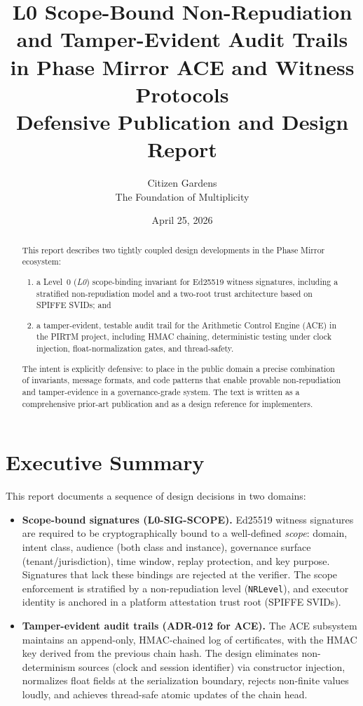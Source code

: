 \documentclass[11pt]{article}
\title{%
  L0 Scope-Bound Non-Repudiation \\ and Tamper-Evident Audit Trails\\
  in Phase Mirror ACE and Witness Protocols\\[0.5ex]
  \large Defensive Publication and Design Report
}
\author{Citizen Gardens \\ The Foundation of Multiplicity}
\date{April 25, 2026}
\begin{document}
\maketitle

\begin{abstract}
This report describes two tightly coupled design developments in the
Phase Mirror ecosystem:

\begin{enumerate}[label=(\alph*)]
  \item a Level~0 (\emph{L0}) scope-binding invariant for Ed25519 witness
        signatures, including a stratified non-repudiation model and a
        two-root trust architecture based on SPIFFE SVIDs; and
  \item a tamper-evident, testable audit trail for the Arithmetic Control
        Engine (ACE) in the PIRTM project, including HMAC chaining,
        deterministic testing under clock injection, float-normalization
        gates, and thread-safety.
\end{enumerate}

The intent is explicitly defensive: to place in the public domain a
precise combination of invariants, message formats, and code patterns
that enable provable non-repudiation and tamper-evidence in a
governance-grade system. The text is written as a comprehensive
prior-art publication and as a design reference for implementers.
\end{abstract}
\newpage
\tableofcontents
\newpage
\section{Executive Summary}

This report documents a sequence of design decisions in two domains:

\begin{itemize}
  \item \textbf{Scope-bound signatures (L0-SIG-SCOPE).} Ed25519 witness
        signatures are required to be cryptographically bound to a
        well-defined \emph{scope}: domain, intent class, audience
        (both class and instance), governance surface (tenant/jurisdiction),
        time window, replay protection, and key purpose. Signatures that
        lack these bindings are rejected at the verifier. The scope
        enforcement is stratified by a non-repudiation level (\texttt{NRLevel}),
        and executor identity is anchored in a platform attestation
        trust root (SPIFFE SVIDs).

  \item \textbf{Tamper-evident audit trails (ADR-012 for ACE).}
        The ACE subsystem maintains an append-only, HMAC-chained log
        of certificates, with the HMAC key derived from the previous
        chain hash. The design eliminates non-determinism sources
        (clock and session identifier) via constructor injection,
        normalizes float fields at the serialization boundary, rejects
        non-finite values loudly, and achieves thread-safe atomic
        updates of the chain head.
\end{itemize}
\end{document}

